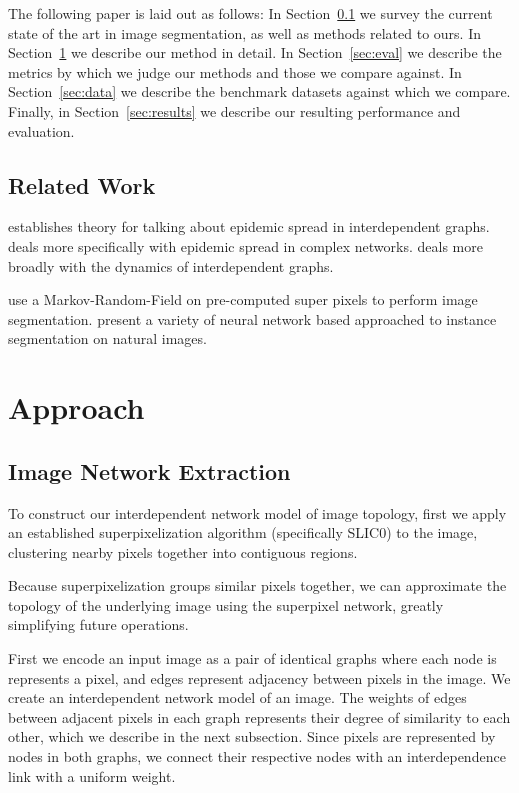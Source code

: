 \documentclass[twocolumn]{article}
\newcommand{\secref}[1]{Section~\ref{sec:#1}}
\newcommand{\seclab}[1]{\label{sec:#1}}
\begin{document}
The following paper is laid out as follows: In \secref{related} we survey the
current state of the art in image segmentation, as well as methods related to
ours. In \secref{approach} we describe our method in detail. In \secref{eval} we
describe the metrics by which we judge our methods and those we compare against.
In \secref{data} we describe the benchmark datasets against which we compare.
Finally, in \secref{results} we describe our resulting performance and
evaluation.

\subsection{Related Work}\seclab{related}

\cite{son2012percolation} establishes theory for talking about epidemic spread
in interdependent graphs. \cite{pastor2015epidemic, pellis2015eight} deals more
specifically with epidemic spread in complex networks.
\cite{boccaletti2014structure, kivela2014multilayer} deals more broadly with the
dynamics of interdependent graphs.

\cite{pei2014saliency} use a Markov-Random-Field on pre-computed super pixels to
perform image segmentation.  \cite{newell2017associative, li2017fully,
ren2017end} present a variety of neural network based approached to instance
segmentation on natural images.

\section{Approach}\seclab{approach}

\subsection{Image Network Extraction}

To construct our interdependent network model of image topology, first we apply an established superpixelization algorithm (specifically SLIC0) to the image, clustering nearby pixels together into contiguous regions.

Because superpixelization groups similar pixels together, we can approximate the topology of the underlying image using the superpixel network, greatly simplifying future operations.

First we encode an input image as a pair of identical graphs where each node is
represents a pixel, and edges represent adjacency between pixels in the image.
We create an interdependent network model of an image. The weights of
edges between adjacent pixels in each graph represents their degree of
similarity to each other, which we describe in the next subsection. Since pixels
are represented by nodes in both graphs, we connect their respective nodes with
an interdependence link with a uniform weight.
\end{document}
